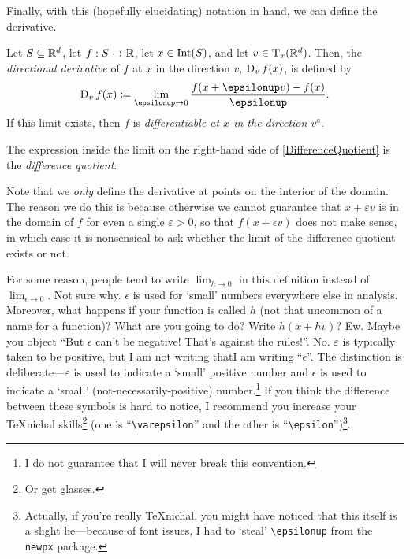 Finally, with this (hopefully elucidating) notation in hand, we can define the derivative.
\begin{dfn}\label{DirectionalDerivative}
Let $S\subseteq \R ^d$, let $f:S\rightarrow \R$, let $x\in \Int (S)$, and let $v\in \tangent{\R ^d}{x}$.  Then, the \emph{directional derivative} of $f$ at $x$ in the direction $v$, $\D _vf(x)$, is defined by
\begin{equation}\label{DifferenceQuotient}
\D _vf(x)\coloneqq \lim _{\epsilon \to 0}\frac{f(x+\epsilon v)-f(x)}{\epsilon}.
\end{equation}
If this limit exists, then $f$ is \emph{differentiable at $x$ in the direction $v^a$}.
\begin{rmk}
The expression inside the limit on the right-hand side of \eqref{DifferenceQuotient} is the \emph{difference quotient}.
\end{rmk}
\begin{rmk}
Note that we \emph{only} define the derivative at points on the interior of the domain.  The reason we do this is because otherwise we cannot guarantee that $x+\varepsilon v$ is in the domain of $f$ for even a single $\varepsilon >0$, so that $f(x+\epsilon v)$ does not make sense, in which case it is nonsensical to ask whether the limit of the difference quotient exists or not.
\end{rmk}
\begin{rmk}
For some reason, people tend to write $\lim _{h\to 0}$ in this definition instead of $\lim _{\epsilon \to 0}$.  Not sure why.  $\epsilon$ is used for `small' numbers everywhere else in analysis.  Moreover, what happens if your function is called $h$ (not that uncommon of a name for a function)?  What are you going to do?  Write $h(x+hv)$?  Ew.  Maybe you object ``But $\epsilon$ can't be negative!  That's against the rules!''.  No.  $\varepsilon$ is typically taken to be positive, but I am not writing that\textellipsis I am writing ``$\epsilon$''.  The distinction is deliberate---$\varepsilon$ is used to indicate a `small' positive number and $\epsilon$ is used to indicate a `small' (not-necessarily-positive) number.\footnote{I do not guarantee that I will never break this convention.}  If you think the difference between these symbols is hard to notice, I recommend you increase your \TeX nichal skills\footnote{Or get glasses.} (one is ``\texttt{\textbackslash varepsilon}'' and the other is ``\texttt{\textbackslash epsilon}'')\footnote{Actually, if you're really \TeX nichal, you might have noticed that this itself is a slight lie---because of font issues, I had to `steal' \texttt{\textbackslash epsilonup} from the \texttt{newpx} package.}.
\end{rmk}
\end{dfn}
